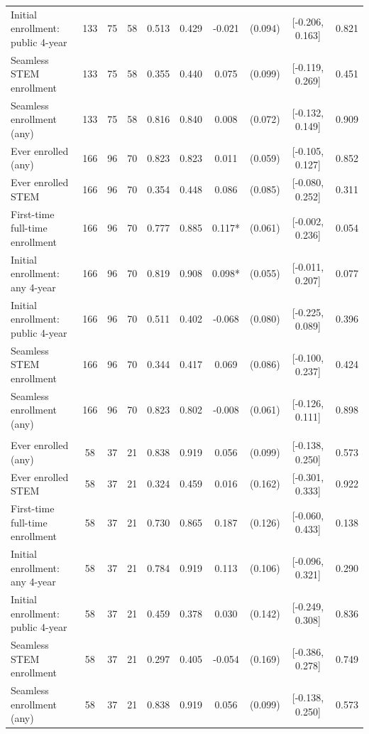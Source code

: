 \begin{table}[t]
\begin{tabular*}{\linewidth}{@{\extracolsep{\fill}}l|ccccccccc}
Initial enrollment: public 4-year & 133 & 75 & 58 & 0.513 & 0.429 & -0.021 & (0.094) & [-0.206, 0.163] & 0.821 \\ 
Seamless STEM enrollment & 133 & 75 & 58 & 0.355 & 0.440 & 0.075 & (0.099) & [-0.119, 0.269] & 0.451 \\ 
Seamless enrollment (any) & 133 & 75 & 58 & 0.816 & 0.840 & 0.008 & (0.072) & [-0.132, 0.149] & 0.909 \\ 
Ever enrolled (any) & 166 & 96 & 70 & 0.823 & 0.823 & 0.011 & (0.059) & [-0.105, 0.127] & 0.852 \\ 
Ever enrolled STEM & 166 & 96 & 70 & 0.354 & 0.448 & 0.086 & (0.085) & [-0.080, 0.252] & 0.311 \\ 
First-time full-time enrollment & 166 & 96 & 70 & 0.777 & 0.885 & 0.117* & (0.061) & [-0.002, 0.236] & 0.054 \\ 
Initial enrollment: any 4-year & 166 & 96 & 70 & 0.819 & 0.908 & 0.098* & (0.055) & [-0.011, 0.207] & 0.077 \\ 
Initial enrollment: public 4-year & 166 & 96 & 70 & 0.511 & 0.402 & -0.068 & (0.080) & [-0.225, 0.089] & 0.396 \\ 
Seamless STEM enrollment & 166 & 96 & 70 & 0.344 & 0.417 & 0.069 & (0.086) & [-0.100, 0.237] & 0.424 \\ 
Seamless enrollment (any) & 166 & 96 & 70 & 0.823 & 0.802 & -0.008 & (0.061) & [-0.126, 0.111] & 0.898 \\ 
\midrule\addlinespace[2.5pt]
\multicolumn{10}{l}{{\itshape \textbf{Panel B: Enrollment Outcomes} \emph{(NSC-matched students only)}}} \\[2.5pt] 
\midrule\addlinespace[2.5pt]
Ever enrolled (any) & 58 & 37 & 21 & 0.838 & 0.919 & 0.056 & (0.099) & [-0.138, 0.250] & 0.573 \\ 
Ever enrolled STEM & 58 & 37 & 21 & 0.324 & 0.459 & 0.016 & (0.162) & [-0.301, 0.333] & 0.922 \\ 
First-time full-time enrollment & 58 & 37 & 21 & 0.730 & 0.865 & 0.187 & (0.126) & [-0.060, 0.433] & 0.138 \\ 
Initial enrollment: any 4-year & 58 & 37 & 21 & 0.784 & 0.919 & 0.113 & (0.106) & [-0.096, 0.321] & 0.290 \\ 
Initial enrollment: public 4-year & 58 & 37 & 21 & 0.459 & 0.378 & 0.030 & (0.142) & [-0.249, 0.308] & 0.836 \\ 
Seamless STEM enrollment & 58 & 37 & 21 & 0.297 & 0.405 & -0.054 & (0.169) & [-0.386, 0.278] & 0.749 \\ 
Seamless enrollment (any) & 58 & 37 & 21 & 0.838 & 0.919 & 0.056 & (0.099) & [-0.138, 0.250] & 0.573 \\ 

\end{tabular*}
\end{table}
